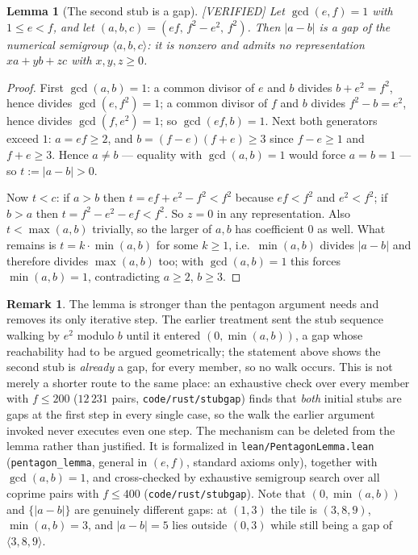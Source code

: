 \documentclass[11pt,reqno]{amsart}
\theoremstyle{plain}
\newtheorem{lemma}[theorem]{Lemma}
\theoremstyle{definition}
\newtheorem{remark}[theorem]{Remark}
\newcommand{\lab}[1]{\hfill\textnormal{\footnotesize\textsc{[#1]}}}
\begin{document}
\begin{lemma}[The second stub is a gap]\label{lem:stubgap}\lab{VERIFIED}
Let $\gcd(e,f)=1$ with $1\le e<f$, and let $(a,b,c)=(ef,\,f^2-e^2,\,f^2)$. Then $|a-b|$ is a gap of
the numerical semigroup $\langle a,b,c\rangle$: it is nonzero and admits no representation
$xa+yb+zc$ with $x,y,z\ge0$.
\end{lemma}
\begin{proof}
First $\gcd(a,b)=1$: a common divisor of $e$ and $b$ divides $b+e^2=f^2$, hence divides
$\gcd(e,f^2)=1$; a common divisor of $f$ and $b$ divides $f^2-b=e^2$, hence divides
$\gcd(f,e^2)=1$; so $\gcd(ef,b)=1$. Next both generators exceed $1$: $a=ef\ge2$, and
$b=(f-e)(f+e)\ge3$ since $f-e\ge1$ and $f+e\ge3$. Hence $a\ne b$ --- equality with $\gcd(a,b)=1$
would force $a=b=1$ --- so $t:=|a-b|>0$.

Now $t<c$: if $a>b$ then $t=ef+e^2-f^2<f^2$ because $ef<f^2$ and $e^2<f^2$; if $b>a$ then
$t=f^2-e^2-ef<f^2$. So $z=0$ in any representation. Also $t<\max(a,b)$ trivially, so the larger of
$a,b$ has coefficient $0$ as well. What remains is $t=k\cdot\min(a,b)$ for some $k\ge1$, i.e.\
$\min(a,b)$ divides $|a-b|$ and therefore divides $\max(a,b)$ too; with $\gcd(a,b)=1$ this forces
$\min(a,b)=1$, contradicting $a\ge2$, $b\ge3$.
\end{proof}

\begin{remark}
The lemma is stronger than the pentagon argument needs and removes its only iterative step. The
earlier treatment sent the stub sequence walking by $e^2$ modulo $b$ until it entered
$(0,\min(a,b))$, a gap whose reachability had to be argued geometrically; the statement above shows
the second stub is \emph{already} a gap, for every member, so no walk occurs. This is not merely a
shorter route to the same place: an exhaustive check over every member with $f\le200$
($12\,231$ pairs, \texttt{code/rust/stubgap}) finds that \emph{both} initial stubs are gaps at the first
step in every single case, so the walk the earlier argument invoked never executes even one step.
The mechanism can be deleted from the lemma rather than justified. It is formalized in
\textup{\texttt{lean/PentagonLemma.lean}} (\texttt{pentagon\_lemma}, general in $(e,f)$, standard axioms only),
together with $\gcd(a,b)=1$, and cross-checked by exhaustive semigroup search over all coprime pairs
with $f\le400$ (\texttt{code/rust/stubgap}). Note that $(0,\min(a,b))$ and $\{|a-b|\}$ are genuinely
different gaps: at $(1,3)$ the tile is $(3,8,9)$, $\min(a,b)=3$, and $|a-b|=5$ lies outside
$(0,3)$ while still being a gap of $\langle3,8,9\rangle$.
\end{remark}
\end{document}
